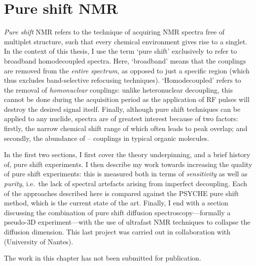 \chapter{Pure shift NMR}
\label{chpt:pureshift}

\textit{Pure shift} NMR refers to the technique of acquiring NMR spectra free of multiplet structure, such that every chemical environment gives rise to a singlet.\autocite{Zangger2015PNMRS,Castanar2017MRC}
In the context of this thesis, I use the term `pure shift' exclusively to refer to broadband homodecoupled \proton{} spectra.
Here, `broadband' means that the couplings are removed from the \textit{entire spectrum}, as opposed to just a specific region (which thus excludes band-selective refocusing techniques).
`Homodecoupled' refers to the removal of \textit{homonuclear} couplings: unlike heteronuclear decoupling, this cannot be done during the acquisition period as the application of RF pulses will destroy the desired signal itself.
Finally, although pure shift techniques can be applied to any nuclide, \proton{} spectra are of greatest interest because of two factors: firstly, the narrow chemical shift range of \proton{} which often leads to peak overlap; and secondly, the abundance of \proton{}--\proton{} couplings in typical organic molecules.

In the first two sections, I first cover the theory underpinning, and a brief history of, pure shift experiments.
I then describe my work towards increasing the quality of pure shift experiments: this is measured both in terms of \textit{sensitivity} as well as \textit{purity}, i.e.\ the lack of spectral artefacts arising from imperfect decoupling.
Each of the approaches described here is compared against the PSYCHE pure shift method, which is the current state of the art.
Finally, I end with a section discussing the combination of pure shift diffusion spectroscopy---formally a pseudo-3D experiment---with the use of ultrafast NMR techniques to collapse the diffusion dimension.
This last project was carried out in collaboration with \JND{} (University of Nantes).

The work in this chapter has not been submitted for publication.

\clearpage









\printbibliography[heading=subbibnumbered]{}
